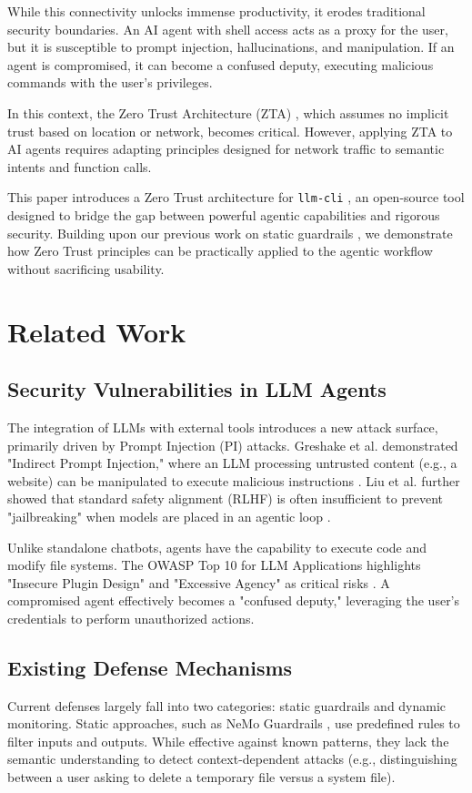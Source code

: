 \documentclass[conference]{IEEEtran}
\begin{document}
While this connectivity unlocks immense productivity, it erodes traditional security boundaries. An AI agent with shell access acts as a proxy for the user, but it is susceptible to prompt injection, hallucinations, and manipulation. If an agent is compromised, it can become a confused deputy, executing malicious commands with the user's privileges.

In this context, the Zero Trust Architecture (ZTA) \cite{nist}, which assumes no implicit trust based on location or network, becomes critical. However, applying ZTA to AI agents requires adapting principles designed for network traffic to semantic intents and function calls.

This paper introduces a Zero Trust architecture for \texttt{llm-cli} \cite{ando2026}, an open-source tool designed to bridge the gap between powerful agentic capabilities and rigorous security. Building upon our previous work on static guardrails \cite{ando2026}, we demonstrate how Zero Trust principles can be practically applied to the agentic workflow without sacrificing usability.

\section{Related Work}

\subsection{Security Vulnerabilities in LLM Agents}
The integration of LLMs with external tools introduces a new attack surface, primarily driven by Prompt Injection (PI) attacks. Greshake et al. demonstrated "Indirect Prompt Injection," where an LLM processing untrusted content (e.g., a website) can be manipulated to execute malicious instructions \cite{greshake2023}. Liu et al. further showed that standard safety alignment (RLHF) is often insufficient to prevent "jailbreaking" when models are placed in an agentic loop \cite{liu2023}.

Unlike standalone chatbots, agents have the capability to execute code and modify file systems. The OWASP Top 10 for LLM Applications highlights "Insecure Plugin Design" and "Excessive Agency" as critical risks \cite{owasp2023}. A compromised agent effectively becomes a "confused deputy," leveraging the user's credentials to perform unauthorized actions.

\subsection{Existing Defense Mechanisms}
Current defenses largely fall into two categories: static guardrails and dynamic monitoring.
Static approaches, such as NeMo Guardrails \cite{nemo}, use predefined rules to filter inputs and outputs. While effective against known patterns, they lack the semantic understanding to detect context-dependent attacks (e.g., distinguishing between a user asking to delete a temporary file versus a system file).
\end{document}
